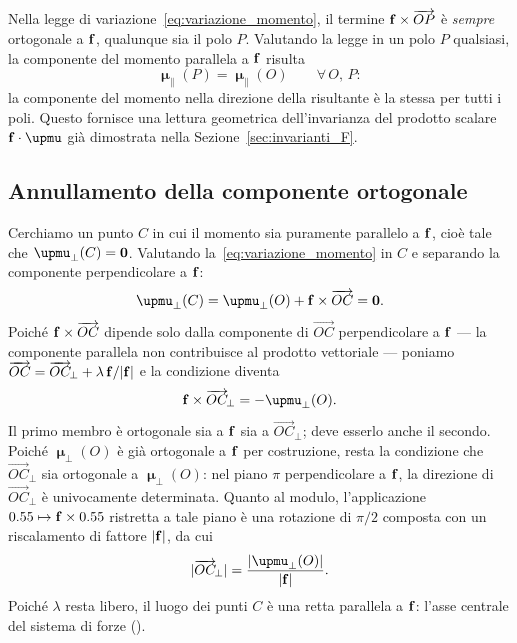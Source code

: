 Nella legge di variazione~\eqref{eq:variazione_momento}, il
termine $\mathbf{f} \times \overrightarrow{OP}$ è \textit{sempre}
ortogonale a $\mathbf{f}$, qualunque sia il polo $P$. Valutando la
legge in un polo $P$ qualsiasi, la componente del momento
parallela a $\mathbf{f}$ risulta
\begin{equation}
	\bm{\upmu}_{\parallel}(P)
	= \bm{\upmu}_{\parallel}(O)
	\qquad \forall\, O,\, P:
\end{equation}
la componente del momento nella direzione della risultante è
la stessa per tutti i poli. Questo fornisce una lettura
geometrica dell'invarianza del prodotto scalare
$\fb \cdot \bm{\upmu}$ già dimostrata nella
Sezione~\ref{sec:invarianti_F}.

\subsection{Annullamento della componente ortogonale}

Cerchiamo un punto $C$ in cui il momento sia puramente
parallelo a $\mathbf{f}$, cioè tale che
$\bm{\upmu}_{\perp}(C) = \zerovb$. Valutando
la~\eqref{eq:variazione_momento} in $C$ e separando la
componente perpendicolare a $\mathbf{f}$:
\begin{equation}\label{eq:cond_annull_stat}
	\bm{\upmu}_{\perp}(C)
	= \bm{\upmu}_{\perp}(O)
	+ \fb \times \overrightarrow{OC}
	= \zerovb.
\end{equation}
Poiché $\mathbf{f} \times \overrightarrow{OC}$ dipende solo dalla
componente di $\overrightarrow{OC}$ perpendicolare a $\mathbf{f}$
--- la componente parallela non contribuisce al prodotto
vettoriale --- poniamo
$\overrightarrow{OC} = \overrightarrow{OC}_{\!\perp}
+ \lambda\,\mathbf{f}/|\mathbf{f}|$
e la condizione diventa
\begin{equation}\label{eq:cond_annull_stat2}
	\fb \times \overrightarrow{OC}_{\!\perp}
	= -\bm{\upmu}_{\perp}(O).
\end{equation}
Il primo membro è ortogonale sia a $\mathbf{f}$ sia a
$\overrightarrow{OC}_{\!\perp}$; deve esserlo anche il
secondo. Poiché $\bm{\upmu}_{\perp}(O)$ è già ortogonale a
$\mathbf{f}$ per costruzione, resta la condizione che
$\overrightarrow{OC}_{\!\perp}$ sia ortogonale a
$\bm{\upmu}_{\perp}(O)$: nel piano $\pi$ perpendicolare a $\mathbf{f}$,
la direzione di $\overrightarrow{OC}_{\!\perp}$ è
univocamente determinata. Quanto al modulo, l'applicazione
$0.55 \mapsto \mathbf{f} \times 0.55$ ristretta a tale piano è una
rotazione di $\pi/2$ composta con un riscalamento di fattore
$|\mathbf{f}|$, da cui
\begin{equation}
	|\overrightarrow{OC}_{\!\perp}|
	= \frac{|\bm{\upmu}_{\perp}(O)|}{|\fb|}.
\end{equation}
Poiché $\lambda$ resta libero, il luogo dei punti $C$ è una
retta parallela a $\mathbf{f}$: l'asse centrale del sistema di forze
().

